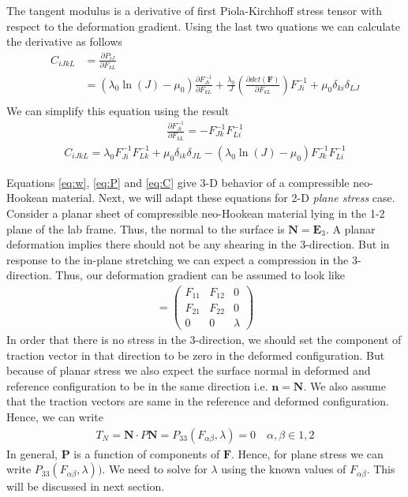 \message{ !name(p1_2.tex)}\documentclass[../main.tex]{subfiles}
\begin{document}
The tangent modulus is a derivative of first Piola-Kirchhoff stress
tensor with respect to the deformation gradient. Using the last two
quations we can calculate the derivative as follows
\begin{align*}
  C_{iJkL}&=\frac{\partial P_{iJ}}{\partial F_{kL}}\\
          &= \left(\lambda_0\ln(J) - \mu_0\right)\frac{\partial F^{-1}_{Ji}}{\partial F_{kL}} + \frac{\lambda_0}{J}\left(\frac{\partial det(\mathbf{F})}{\partial F_{kL}}\right)F^{-1}_{Ji} + \mu_0\delta_{ki}\delta_{LJ}\\
\end{align*}
We can simplify this equation using the result
\begin{align*}
  \frac{\partial F^{-1}_{Ji}}{\partial F_{kL}} = -F^{-1}_{Jk}F^{-1}_{Li}
\end{align*}
\begin{align}
  \label{eq:C}
  \boxed{C_{iJkL}=\lambda_0F^{-1}_{Ji}F^{-1}_{Lk} + \mu_0\delta_{ik}\delta_{JL}-(\lambda_0\ln(J) - \mu_0)F^{-1}_{Jk}F^{-1}_{Li}}
\end{align}

Equations \ref{eq:w}, \ref{eq:P} and \ref{eq:C} give 3-D behavior of a
compressible neo-Hookean material. Next, we will adapt these equations
for 2-D \textit{plane stress} case. Consider a planar sheet of
compressible neo-Hookean material lying in the 1-2 plane of the lab
frame. Thus, the normal to the surface is $\bm{N} = \bm{E}_3$.  A
planar deformation implies there should not be any shearing in the
3-direction. But in response to the in-plane stretching we can expect
a compression in the 3-direction. Thus, our deformation gradient can
be assumed to look like
\begin{align*}
  [F_{iJ}] =
  \begin{pmatrix}
    F_{11} & F_{12} & 0\\
    F_{21} & F_{22} & 0\\
    0 & 0 & \lambda
  \end{pmatrix}
\end{align*}
In order that there is no stress in the 3-direction, we should set the
component of traction vector in that direction to be zero in the
deformed configuration. But because of planar stress we also expect
the surface normal in deformed and reference configuration to be in
the same direction i.e. $\bm{n} = \bm{N}$. We also assume that the
traction vectors are same in the reference and deformed
configuration. Hence, we can write
\begin{align}
  \label{eq:planeStress}
  T_N = \bm{N}\cdot P\bm{N} = P_{33}(F_{\alpha\beta},\lambda) = 0 \quad \alpha,\beta\in{1,2}
\end{align}
In general, $\mathbf{P}$ is a function of components of
$\mathbf{F}$. Hence, for plane stress we can write
$P_{33}(F_{\alpha\beta},\lambda))$. We need to solve for $\lambda$
using the known values of $F_{\alpha\beta}$. This will be discussed in
next section.
\end{document}
